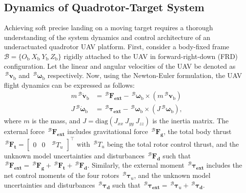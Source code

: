 \documentclass[lettersize,journal]{IEEEtran}
\begin{document}
\subsection{Dynamics of Quadrotor-Target System} \label{quadrotor dynamics: section}
Achieving soft precise landing on a moving target requires a thorough understanding of the system dynamics and control architecture of an underactuated quadrotor UAV platform. 
First, consider a body-fixed frame $\mathcal{B}=\{O_{\text{b}} ~X_{\text{b}} ~Y_{\text{b}} ~Z_{\text{b}}\}$ rigidly attached to the UAV in forward-right-down (FRD) configuration.
Let the linear and angular velocities of the UAV be denoted as $\,^\mathcal{B} \boldsymbol{v}_{\text{b}}$ and $\,^\mathcal{B} \boldsymbol{\omega}_{\text{b}}$ respectively.
Now, using the Newton-Euler formulation, the UAV flight dynamics can be expressed as follows:
\begin{align}
\label{quadrotor dynamics: equation}
    m \,^\mathcal{B} \dot{\boldsymbol{v}}_{\text{b}} &= \,^\mathcal{B} \boldsymbol{F_{\text{ext}}} - \,^\mathcal{B} \boldsymbol{\omega}_{\text{b}} \times (m \,^\mathcal{B} \boldsymbol{v}_{\text{b}})  \nonumber \\
    J \,^\mathcal{B} \dot{\boldsymbol{\omega}}_{\text{b}} &= \,^\mathcal{B} \boldsymbol{\tau_{\text{ext}}} - \,^\mathcal{B} \boldsymbol{\omega}_{\text{b}} \times (J \,^\mathcal{B} \boldsymbol{\omega}_{\text{b}}),
\end{align}
where $m$ is the mass,  and $J = \text{diag}(J_{xx}~J_{yy}~J_{zz})$ is the inertia matrix.
The external force $\,^\mathcal{B} \boldsymbol{F_{\text{ext}}}$ includes gravitational force $\,^\mathcal{B} \boldsymbol{F_{\text{g}}}$, the total body thrust $\,^\mathcal{B} \boldsymbol{F_{\text{t}}} = \begin{bmatrix} 0 & 0 & \,^\mathcal{B} T_u\end{bmatrix}^\top $ with $\,^\mathcal{B} T_u$ being the total rotor control thrust, and the unknown model uncertainties and disturbances $\,^\mathcal{B} \boldsymbol{F_{\text{d}}}$ such that $\,^\mathcal{B} \boldsymbol{F_{\text{ext}}} = \,^\mathcal{B} \boldsymbol{F_{\text{g}}} + \,^\mathcal{B} \boldsymbol{F_{\text{t}}} + \,^\mathcal{B} \boldsymbol{F_{\text{d}}}$.
Similarly, the external moment $\,^\mathcal{B} \boldsymbol{\tau_{\text{ext}}}$ includes the net control moments of the four rotors $\,^\mathcal{B} \boldsymbol{\tau}_u$, and the unknown model uncertainties and disturbances $\,^\mathcal{B} \boldsymbol{\tau_{\text{d}}}$ such that $\,^\mathcal{B} \boldsymbol{\tau_{\text{ext}}} = \,^\mathcal{B} \boldsymbol{\tau}_u + \,^\mathcal{B} \boldsymbol{\tau_{\text{d}}}$.
\end{document}
